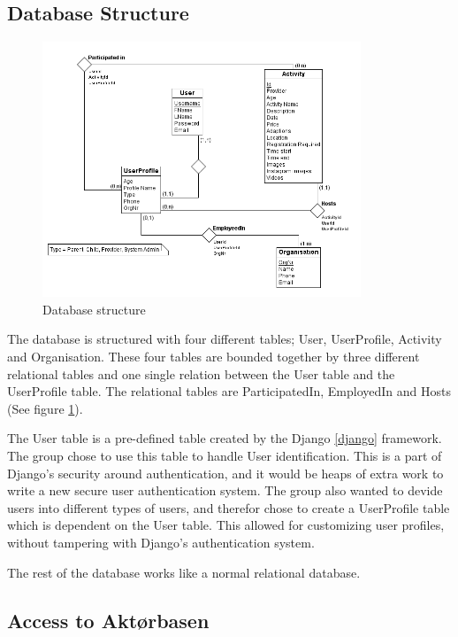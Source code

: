 \subsection{Database Structure}
\begin{figure}[h!]
\centering
    \includegraphics[width=0.85\textwidth]{fig/database_diagram}
\caption{Database structure}
\label{database_figure}
\end{figure}
The database is structured with four different tables; User, UserProfile, Activity and Organisation. These four tables are bounded together by three different relational tables and one single relation between the User table and the UserProfile table. The relational tables are ParticipatedIn, EmployedIn and Hosts (See figure \ref{database_figure}).

The User table is a pre-defined table created by the Django \ref{django} framework. The group chose to use this table to handle User identification. This is a part of Django's security around authentication, and it would be heaps of extra work to write a new secure user authentication system. The group also wanted to devide users into different types of users, and therefor chose to create a UserProfile table which is dependent on the User table. This allowed for customizing user profiles, without tampering with Django's authentication system. 

The rest of the database works like a normal relational database.





\subsection{Access to Aktørbasen}


